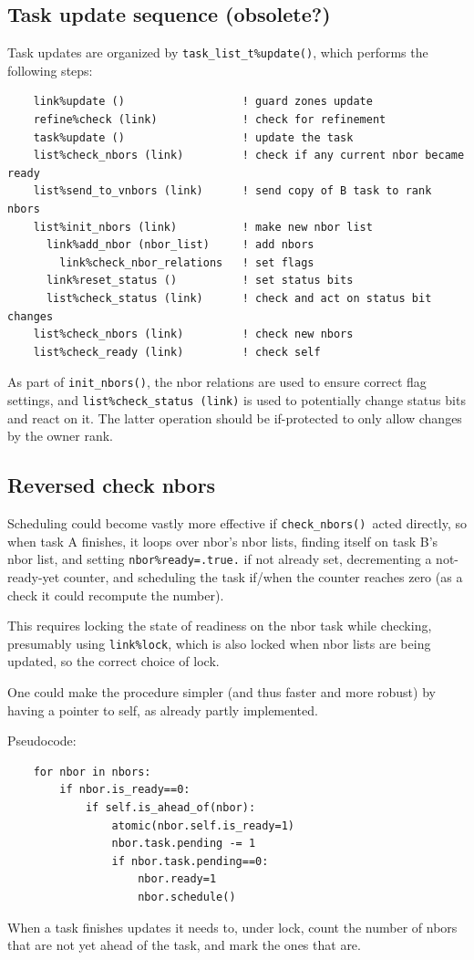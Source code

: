 \documentclass[paper=a4,fontsize=11pt]{scrartcl}
\numberwithin{equation}{section}		%
\numberwithin{figure}{section}			%
\numberwithin{table}{section}				%
\newcommand{\codecolor}{\color{Blue}}
\newcommand{\Code}[1]{{\codecolor\texttt{#1}}}
\def\checknbors{\Code{check\_nbors()}}
\def\initnbors{\Code{init\_nbors()}}
\begin{document}
\subsection{Task update sequence (obsolete?)}
Task updates are organized by \Code{task\_list\_t\%update()}, which performs the following steps:
{\codecolor\small\begin{verbatim}
    link%update ()                  ! guard zones update
    refine%check (link)             ! check for refinement
    task%update ()                  ! update the task
    list%check_nbors (link)         ! check if any current nbor became ready
    list%send_to_vnbors (link)      ! send copy of B task to rank nbors
    list%init_nbors (link)          ! make new nbor list
      link%add_nbor (nbor_list)     ! add nbors
        link%check_nbor_relations   ! set flags
      link%reset_status ()          ! set status bits
      list%check_status (link)      ! check and act on status bit changes
    list%check_nbors (link)         ! check new nbors
    list%check_ready (link)         ! check self
\end{verbatim}}
As part of \initnbors, the nbor relations are used to ensure correct flag settings, and \Code{list\%check\_status (link)} is used to potentially change status bits and react on it. The latter operation should be if-protected to only allow changes by the owner rank.

\subsection{Reversed check nbors}
Scheduling could become vastly more effective if \checknbors\ acted directly, so when task A finishes, it loops over nbor's nbor lists, finding itself on task B's nbor list, and setting \verb|nbor%ready=.true.| if not already set, decrementing a not-ready-yet counter, and scheduling the task if/when the counter reaches zero (as a check it could recompute the number).

This requires locking the state of readiness on the nbor task while checking, presumably using \verb|link%lock|, which is also locked when nbor lists are being updated, so the correct choice of lock.

One could make the procedure simpler (and thus faster and more robust) by having a pointer to self, as already partly implemented.

Pseudocode:
{\small\codecolor\begin{verbatim}
    for nbor in nbors:
        if nbor.is_ready==0:
            if self.is_ahead_of(nbor):
                atomic(nbor.self.is_ready=1)
                nbor.task.pending -= 1
                if nbor.task.pending==0:
                    nbor.ready=1
                    nbor.schedule()
\end{verbatim}}
When a task finishes updates it needs to, under lock, count the number of nbors that are not yet ahead of the task, and mark the ones that are.
\end{document}
